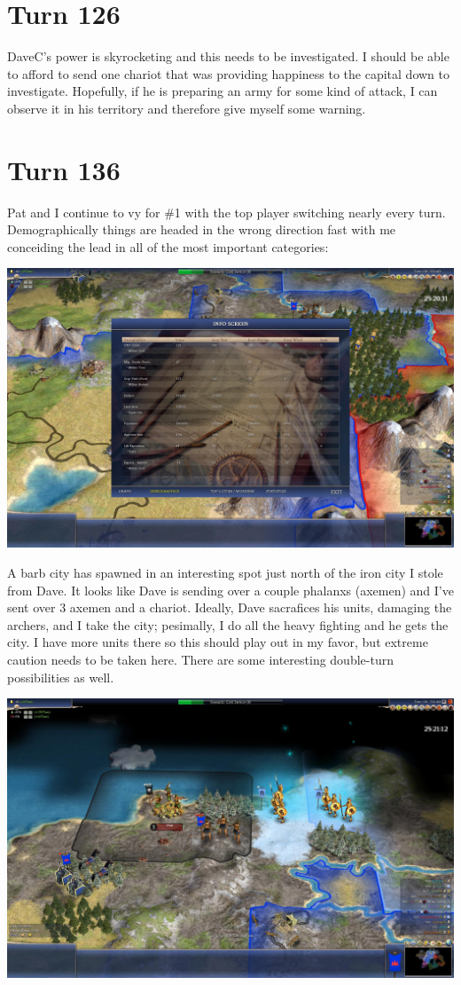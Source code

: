 \documentclass[10pt]{article}
\begin{document}
\section*{Turn 126}

DaveC's power is skyrocketing and this needs to be investigated. I
should be able to afford to send one chariot that was providing
happiness to the capital down to investigate. Hopefully, if he is
preparing an army for some kind of attack, I can observe it in his
territory and therefore give myself some warning.

\section*{Turn 136}

Pat and I continue to vy for \#1 with the top player switching nearly
every turn. Demographically things are headed in the wrong direction
fast with me conceiding the lead in all of the most important
categories:

\includegraphics[width=1.0\textwidth]{turn136}

A barb city has spawned in an interesting spot just north of the iron
city I stole from Dave. It looks like Dave is sending over a couple
phalanxs (axemen) and I've sent over 3 axemen and a chariot. Ideally,
Dave sacrafices his units, damaging the archers, and I take the city;
pesimally, I do all the heavy fighting and he gets the city. I have
more units there so this should play out in my favor, but extreme
caution needs to be taken here. There are some interesting double-turn
possibilities as well.

\includegraphics[width=1.0\textwidth]{turn136-2}
\end{document}
